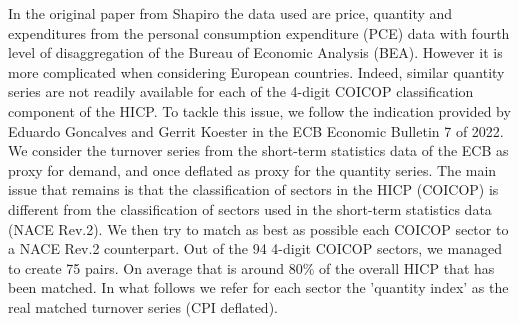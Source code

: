 \quad In the original paper from Shapiro the data used are price, quantity and expenditures from the personal consumption expenditure (PCE) data with fourth level of disaggregation of the Bureau of Economic Analysis (BEA).
However it is more complicated when considering European countries. 
Indeed, similar quantity series are not readily available for each of the 4-digit COICOP classification component of the HICP. 
\bigbreak
To tackle this issue, we follow the indication provided by Eduardo Goncalves and Gerrit Koester in the ECB Economic Bulletin 7 of 2022.
We consider the turnover series from the short-term statistics data of the ECB as proxy for demand, and once deflated as proxy for the quantity series.
The main issue that remains is that the classification of sectors in the HICP (COICOP) is different from the classification of sectors used in the short-term statistics data (NACE Rev.2).
We then try to match as best as possible each COICOP sector to a NACE Rev.2 counterpart. 
Out of the 94 4-digit COICOP sectors, we managed to create 75 pairs. 
On average that is around 80\% of the overall HICP that has been matched.
In what follows we refer for each sector the 'quantity index' as the real matched turnover series (CPI deflated).